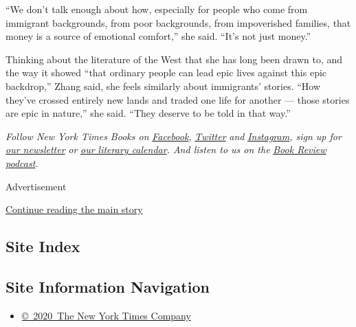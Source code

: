 ``We don't talk enough about how, especially for people who come from
immigrant backgrounds, from poor backgrounds, from impoverished
families, that money is a source of emotional comfort,'' she said.
``It's not just money.''

Thinking about the literature of the West that she has long been drawn
to, and the way it showed ``that ordinary people can lead epic lives
against this epic backdrop,'' Zhang said, she feels similarly about
immigrants' stories. ``How they've crossed entirely new lands and traded
one life for another --- those stories are epic in nature,'' she said.
``They deserve to be told in that way.''

\emph{Follow New York Times Books on}
\href{https://www.facebookcorewwwi.onion/nytbooks/}{\emph{Facebook}}\emph{,}
\href{https://twitter.com/nytimesbooks}{\emph{Twitter}} \emph{and}
\href{https://www.instagram.com/nytbooks/}{\emph{Instagram}}\emph{, sign
up for}
\href{https://www.nytimes3xbfgragh.onion/newsletters/books-review}{\emph{our
newsletter}} \emph{or}
\href{https://www.nytimes3xbfgragh.onion/interactive/2017/books/books-calendar.html}{\emph{our
literary calendar}}\emph{. And listen to us on the}
\href{https://www.nytimes3xbfgragh.onion/column/book-review-podcast}{\emph{Book
Review podcast}}\emph{.}

Advertisement

\protect\hyperlink{after-bottom}{Continue reading the main story}

\hypertarget{site-index}{%
\subsection{Site Index}\label{site-index}}

\hypertarget{site-information-navigation}{%
\subsection{Site Information
Navigation}\label{site-information-navigation}}

\begin{itemize}
\tightlist
\item
  \href{https://help.nytimes3xbfgragh.onion/hc/en-us/articles/115014792127-Copyright-notice}{©~2020~The
  New York Times Company}
\end{itemize}

